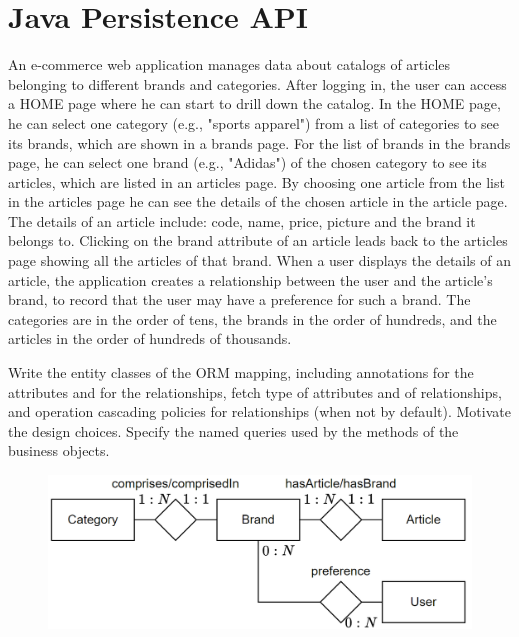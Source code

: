 \section{Java Persistence API}

An e-commerce web application manages data about catalogs of articles belonging to different brands and categories. 
After logging in, the user can access a HOME page where he can start to drill down the catalog. 
In the HOME page, he can select one category (e.g., "sports apparel") from a list of categories to see its brands, which are shown in a brands page. 
For the list of brands in the brands page, he can select one brand (e.g., "Adidas") of the chosen category to see its articles, which are listed in an articles page.
By choosing one article from the list in the articles page he can see the details of the chosen article in the article page. 
The details of an article include: code, name, price, picture and the brand it belongs to.
Clicking on the brand attribute of an article leads back to the articles page showing all the articles of that brand. 
When a user displays the details of an article, the application creates a relationship between the user and the article's brand, to record that the user may have a preference for such a brand.
The categories are in the order of tens, the brands in the order of hundreds, and the articles in the order of hundreds of thousands. 

Write the entity classes of the ORM mapping, including annotations for the attributes and for the relationships, fetch type of attributes and of relationships, and operation cascading policies for relationships (when not by default). 
Motivate the design choices. 
Specify the named queries used by the methods of the business objects.
\begin{figure}[H]
    \centering
    \includegraphics[width=0.6\linewidth]{images/jpa1.png}
\end{figure}

